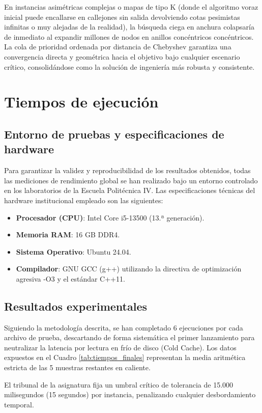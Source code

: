 \documentclass[11pt,a4paper]{article}
\begin{document}
En instancias asimétricas complejas o mapas de tipo K (donde el algoritmo voraz inicial puede encallarse en callejones sin salida devolviendo cotas pesimistas infinitas o muy alejadas de la realidad), la búsqueda ciega en anchura colapsaría de inmediato al expandir millones de nodos en anillos concéntricos concéntricos. La cola de prioridad ordenada por distancia de Chebyshev garantiza una convergencia directa y geométrica hacia el objetivo bajo cualquier escenario crítico, consolidándose como la solución de ingeniería más robusta y consistente.

\section{Tiempos de ejecución}

\subsection{Entorno de pruebas y especificaciones de hardware}
Para garantizar la validez y reproducibilidad de los resultados obtenidos, todas las mediciones de rendimiento global se han realizado bajo un entorno controlado en los laboratorios de la Escuela Politécnica IV. Las especificaciones técnicas del hardware institucional empleado son las siguientes:
\begin{itemize}
    \item \textbf{Procesador (CPU)}: Intel Core i5-13500 (13.ª generación).
    \item \textbf{Memoria RAM}: 16 GB DDR4.
    \item \textbf{Sistema Operativo}: Ubuntu 24.04.
    \item \textbf{Compilador}: GNU GCC (g++) utilizando la directiva de optimización agresiva -O3 y el estándar C++11.
\end{itemize}

\subsection{Resultados experimentales}
Siguiendo la metodología descrita, se han completado 6 ejecuciones por cada archivo de prueba, descartando de forma sistemática el primer lanzamiento para neutralizar la latencia por lectura en frío de disco (Cold Cache). Los datos expuestos en el Cuadro \ref{tab:tiempos_finales} representan la media aritmética estricta de las 5 muestras restantes en caliente. 

El tribunal de la asignatura fija un umbral crítico de tolerancia de 15.000 milisegundos (15 segundos) por instancia, penalizando cualquier desbordamiento temporal.
\end{document}

